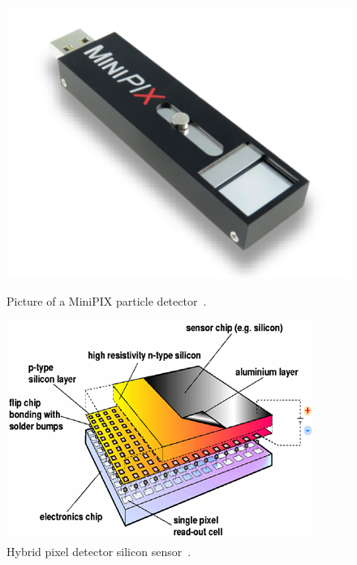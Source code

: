 \begin{figure}[H]
  \begin{minipage}[c]{0.40\linewidth}
    \includegraphics[width=\linewidth]{Figures/minipix_detector.png}
    \caption{Picture of a MiniPIX particle detector~\cite{advacam}.} %
    \label{fig:minipix}
  \end{minipage}
  \hfill
  \begin{minipage}[c]{0.45\linewidth}
    \includegraphics[width=\linewidth]{Figures/Silicon_sensor.png}
    \caption{Hybrid pixel detector silicon sensor~\cite{silicon_sensor}.} %
    \label{fig:minipixlayers}
  \end{minipage}
\end{figure}


